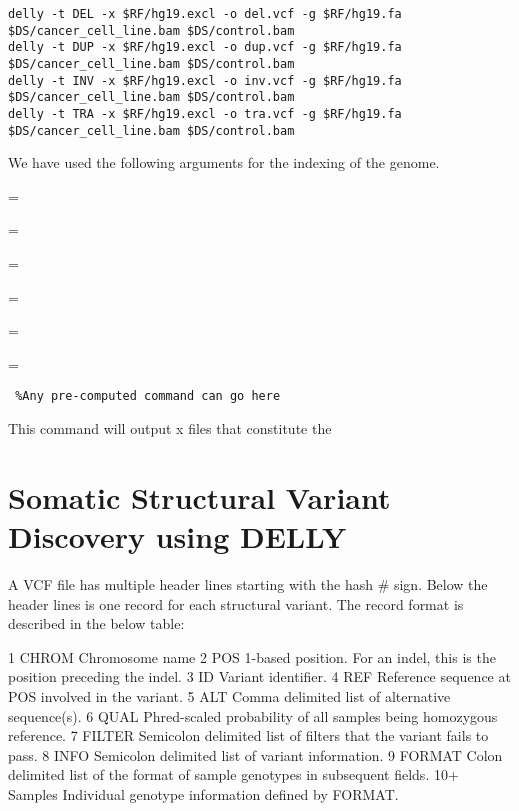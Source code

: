 \begin{steps}

\begin{lstlisting}
delly -t DEL -x $RF/hg19.excl -o del.vcf -g $RF/hg19.fa $DS/cancer_cell_line.bam $DS/control.bam
delly -t DUP -x $RF/hg19.excl -o dup.vcf -g $RF/hg19.fa $DS/cancer_cell_line.bam $DS/control.bam
delly -t INV -x $RF/hg19.excl -o inv.vcf -g $RF/hg19.fa $DS/cancer_cell_line.bam $DS/control.bam
delly -t TRA -x $RF/hg19.excl -o tra.vcf -g $RF/hg19.fa $DS/cancer_cell_line.bam $DS/control.bam

\end{lstlisting}

We have used the following arguments for the indexing of the genome.
\begin{description}[style=multiline,labelindent=0cm,align=right,leftmargin=\descriptionlabelspace,rightmargin=1.5cm,font=\ttfamily]
  \item[DEL] = 
  \item[DUP] = 
  \item[INV] = 
  \item[TRA] = 
  \item[-o] = 
  \item[-g] = 
\end{description}

\begin{warning}
  \begin{lstlisting}
 %Any pre-computed command can go here
  \end{lstlisting}
\end{warning}

This command will output x files that constitute the 

\section{Somatic Structural Variant Discovery using DELLY}

\begin{information}
A VCF file has multiple header lines starting with the hash # sign. Below the header lines is one record for each structural variant. The record format is described in the below table:

1	CHROM	Chromosome name
2 	POS 		1-based position. For an indel, this is the position preceding the indel.
3 	ID 		Variant identifier. 
4	REF		Reference sequence at POS involved in the variant. 
5	ALT		Comma delimited list of alternative sequence(s).
6	QUAL		Phred-scaled probability of all samples being homozygous reference.
7	FILTER	Semicolon delimited list of filters that the variant fails to pass.
8	INFO		Semicolon delimited list of variant information.
9	FORMAT	Colon delimited list of the format of sample genotypes in subsequent fields.
10+ 	Samples	Individual genotype information defined by FORMAT.


\end{information}
\end{steps}
